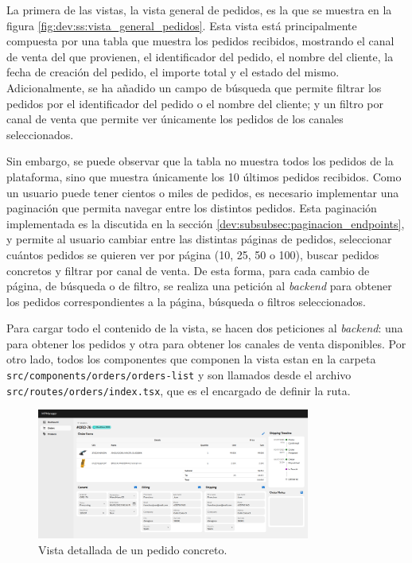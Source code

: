La primera de las vistas, la vista general de pedidos, es la que se muestra en la figura \ref{fig:dev:ss:vista_general_pedidos}. Esta vista está principalmente compuesta por una tabla que muestra los pedidos recibidos, mostrando el canal de venta del que provienen, el identificador del pedido, el nombre del cliente, la fecha de creación del pedido, el importe total y el estado del mismo. Adicionalmente, se ha añadido un campo de búsqueda que permite filtrar los pedidos por el identificador del pedido o el nombre del cliente; y un filtro por canal de venta que permite ver únicamente los pedidos de los canales seleccionados.

Sin embargo, se puede observar que la tabla no muestra todos los pedidos de la plataforma, sino que muestra únicamente los 10 últimos pedidos recibidos. Como un usuario puede tener cientos o miles de pedidos, es necesario implementar una paginación que permita navegar entre los distintos pedidos. Esta paginación implementada es la discutida en la sección \ref{dev:subsubsec:paginacion_endpoints}, y permite al usuario cambiar entre las distintas páginas de pedidos, seleccionar cuántos pedidos se quieren ver por página (10, 25, 50 o 100), buscar pedidos concretos y filtrar por canal de venta. De esta forma, para cada cambio de página, de búsqueda o de filtro, se realiza una petición al \textit{backend} para obtener los pedidos correspondientes a la página, búsqueda o filtros seleccionados.

Para cargar todo el contenido de la vista, se hacen dos peticiones al \textit{backend}: una para obtener los pedidos y otra para obtener los canales de venta disponibles. Por otro lado, todos los componentes que componen la vista estan en la carpeta \texttt{src/components/orders/orders-list} y son llamados desde el archivo \texttt{src/routes/orders/index.tsx}, que es el encargado de definir la ruta.

\begin{figure}[H]
    \centering
    \includegraphics[width=0.8\textwidth]{figures/design_develop/screenshots/detalle_pedidos.png}
    \caption{Vista detallada de un pedido concreto.}
    \label{fig:dev:ss:vista_detallada_pedidos}
\end{figure}

